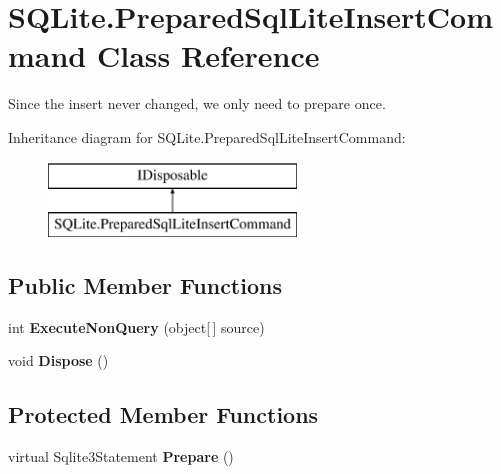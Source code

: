 \hypertarget{classSQLite_1_1PreparedSqlLiteInsertCommand}{}\section{S\+Q\+Lite.\+Prepared\+Sql\+Lite\+Insert\+Command Class Reference}
\label{classSQLite_1_1PreparedSqlLiteInsertCommand}


Since the insert never changed, we only need to prepare once.  


Inheritance diagram for S\+Q\+Lite.\+Prepared\+Sql\+Lite\+Insert\+Command\+:\begin{figure}[H]
\begin{center}
\leavevmode
\includegraphics[height=2.000000cm]{classSQLite_1_1PreparedSqlLiteInsertCommand}
\end{center}
\end{figure}
\subsection*{Public Member Functions}
\begin{DoxyCompactItemize}
\item 
\hypertarget{classSQLite_1_1PreparedSqlLiteInsertCommand_a9f95629a1b978710741c23129d78fccc}{}int {\bfseries Execute\+Non\+Query} (object\mbox{[}$\,$\mbox{]} source)\label{classSQLite_1_1PreparedSqlLiteInsertCommand_a9f95629a1b978710741c23129d78fccc}

\item 
\hypertarget{classSQLite_1_1PreparedSqlLiteInsertCommand_a4569b8fb13658e105658b073937efead}{}void {\bfseries Dispose} ()\label{classSQLite_1_1PreparedSqlLiteInsertCommand_a4569b8fb13658e105658b073937efead}

\end{DoxyCompactItemize}
\subsection*{Protected Member Functions}
\begin{DoxyCompactItemize}
\item 
\hypertarget{classSQLite_1_1PreparedSqlLiteInsertCommand_a207353ff88c74bc45cb076fe3cf463bb}{}virtual Sqlite3\+Statement {\bfseries Prepare} ()\label{classSQLite_1_1PreparedSqlLiteInsertCommand_a207353ff88c74bc45cb076fe3cf463bb}

\end{DoxyCompactItemize}
